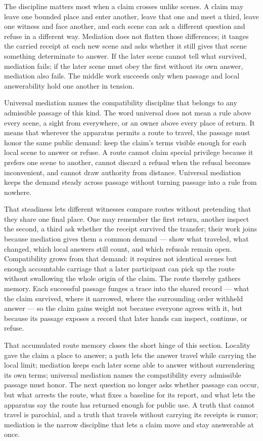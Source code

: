 The discipline matters most when a claim crosses unlike scenes. A claim may leave one bounded place and enter another, leave that one and meet a third, leave one witness and face another, and each scene can ask a different question and refuse in a different way. Mediation does not flatten those differences; it tanges the carried receipt at each new scene and asks whether it still gives that scene something determinate to answer. If the later scene cannot tell what survived, mediation fails; if the later scene must obey the first without its own answer, mediation also fails. The middle work succeeds only when passage and local answerability hold one another in tension.

Universal mediation names the compatibility discipline that belongs to any admissible passage of this kind. The word universal does not mean a rule above every scene, a sight from everywhere, or an owner above every place of return. It means that wherever the apparatus permits a route to travel, the passage must honor the same public demand: keep the claim's terms visible enough for each local scene to answer or refuse. A route cannot claim special privilege because it prefers one scene to another, cannot discard a refusal when the refusal becomes inconvenient, and cannot draw authority from distance. Universal mediation keeps the demand steady across passage without turning passage into a rule from nowhere.

That steadiness lets different witnesses compare routes without pretending that they share one final place. One may remember the first return, another inspect the second, a third ask whether the receipt survived the transfer; their work joins because mediation gives them a common demand --- show what traveled, what changed, which local answers still count, and which refusals remain open. Compatibility grows from that demand: it requires not identical scenes but enough accountable carriage that a later participant can pick up the route without swallowing the whole origin of the claim. The route thereby gathers memory. Each successful passage funges a trace into the shared record --- what the claim survived, where it narrowed, where the surrounding order withheld answer --- so the claim gains weight not because everyone agrees with it, but because its passage exposes a record that later hands can inspect, continue, or refuse.

That accumulated route memory closes the short hinge of this section. Locality gave the claim a place to answer; a path lets the answer travel while carrying the local limit; mediation keeps each later scene able to answer without surrendering its own terms; universal mediation names the compatibility every admissible passage must honor. The next question no longer asks whether passage can occur, but what arrests the route, what fixes a baseline for its report, and what lets the apparatus say the route has returned enough for public use. A truth that cannot travel is parochial, and a truth that travels without carrying its receipts is rumor; mediation is the narrow discipline that lets a claim move and stay answerable at once.

